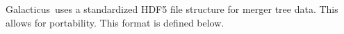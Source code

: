 \documentclass[letterpaper,10pt,headsepline]{scrbook}
\def\glc{{\sc Galacticus}}
\begin{document}
\glc\ uses a standardized HDF5 file structure for merger tree data. This allows for portability. This format is defined below.







\backmatter




\printglossaries

\citeindextrue
\printindex
\printindex[code]
\end{document}
